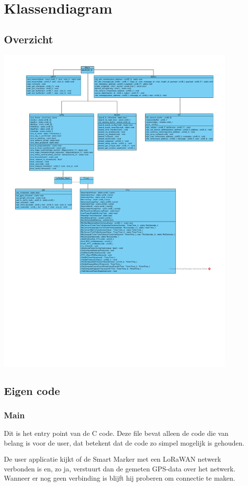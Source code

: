 \section{Klassendiagram}
\subsection{Overzicht}
\includegraphics[width=0.9\textwidth]{technical/class_diagram.pdf}

\subsection{Eigen code}
\subsubsection{Main}
Dit is het entry point van de C code. Deze file bevat alleen de code die van belang
is voor de user, dat betekent dat de code zo simpel mogelijk is gehouden.

De user applicatie kijkt of de Smart Marker met een LoRaWAN netwerk verbonden is
en, zo ja, verstuurt dan de gemeten GPS-data over het netwerk. Wanneer er nog
geen verbinding is blijft hij proberen om connectie te maken.

